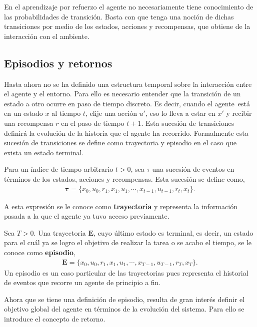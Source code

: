 En el aprendizaje por refuerzo el agente no necesariamente tiene conocimiento de las probabilidades de transición. Basta con que tenga una noción de dichas transiciones por medio de los estados, acciones y recompensas, que obtiene de la interacción con el ambiente. 

\subsection{Episodios y retornos} 

Hasta ahora no se ha definido una estructura temporal sobre la interacción entre el agente y el entorno. Para ello es necesario entender que la transición de un estado a otro ocurre en paso de tiempo discreto. Es decir, cuando el agente está en un estado $x$ al tiempo $t$, elije una acción $u'$, eso lo lleva a estar en $x'$ y recibir una recompensa $r$ en el paso de tiempo $t +1$. Esta sucesión de transiciones definirá la evolución de la historia que el agente ha recorrido. Formalmente esta sucesión de transiciones se define como trayectoria y episodio en el caso que exista un estado terminal. 

\begin{definition} Para un índice de tiempo arbitrario $t >0$, sea $\tau$ una sucesión de eventos en términos de los estados, acciones y recompensas. Esta sucesión se define como, 
\begin{align}
    \bm\tau = \{x_0, u_0, r_1, x_1, u_1, \cdots, x_{t-1}, u_{t-1}, r_t, x_t\}.
\end{align}

A esta expresión se le conoce como \textbf{trayectoria} y representa la información pasada a la que el agente ya tuvo acceso previamente.

Sea $T >0$. Una trayectoria $\mathbf{E}$, cuyo último estado es terminal, es decir, un estado para el cuál ya se logro el objetivo de realizar la tarea o se acabo el tiempo, se le conoce como \textbf{episodio},
\begin{align}
    \mathbf{E} = \{x_0, u_0, r_1, x_1, u_1, \cdots, x_{T-1}, u_{T-1}, r_{T}, x_{T}\}.
\end{align}
Un episodio es un caso particular de las trayectorias pues representa el historial de eventos que recorre un agente de principio a fin. 
\end{definition}

Ahora que se tiene una definición de episodio, resulta de gran interés definir el objetivo global del agente en términos de la evolución del sistema. Para ello se introduce el concepto de retorno.

